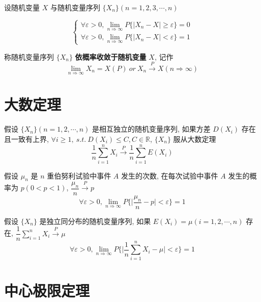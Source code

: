 \begin{definition}[依概率收敛]
	设随机变量 $X$ 与随机变量序列 $\{X_{n}\}(n = 1,2,3,\cdots,n)$
	
	$$\begin{cases}
		\forall \varepsilon > 0, \lim\limits_{n\Rightarrow \infty}P\{|X_{n}-X|\geq \varepsilon\} = 0\\
		\forall \varepsilon > 0, \lim\limits_{n\Rightarrow \infty}P\{|X_{n}-X|< \varepsilon\} = 1
	\end{cases}$$
	
	称随机变量序列 $\{X_{n}\}$ \textbf{依概率收敛于随机变量} $X$, 记作 
	$$\lim\limits_{n\Rightarrow \infty} X_{n} = X(P)\ or\ X_{n}\stackrel{P}{\longrightarrow}X(n\Rightarrow \infty)$$
\end{definition}

\section{大数定理}

\begin{theorem}[切比雪夫大数定理]
	假设 $\{X_{n}\}(n = 1,2,\cdots, n)$ 是相互独立的随机变量序列, 如果方差 $D(X_{i})$ 存在且一致有上界, $\forall i\geq 1,\ s.t.\ D(X_{i})\leq C, C\in \mathbb{R}$,
	$\{X_{n}\}$ 服从大数定理
	$$\dfrac{1}{n}\sum\limits_{i = 1}^{n}X_{i} \stackrel{P}{\longrightarrow} \dfrac{1}{n}\sum\limits_{i=1}^{n}E(X_{i})$$
\end{theorem}

\begin{theorem}[伯努利大数定理]
	假设 $\mu_{n}$ 是 $n$ 重伯努利试验中事件 $A$ 发生的次数, 在每次试验中事件 $A$ 发生的概率为 $p(0<p<1)$, $\dfrac{\mu_{n}}{n}\stackrel{P}{\longrightarrow}p$
	$$\forall \varepsilon > 0,\lim\limits_{n\Rightarrow \infty}P\{\big|\dfrac{\mu_{n}}{n} - p\big| < \varepsilon\} = 1$$
\end{theorem}

\begin{theorem}[辛钦大数定理]
	假设 $\{X_{n}\}$ 是独立同分布的随机变量序列, 如果 $E(X_{i}) = \mu(i = 1,2,\cdots,n)$ 存在, $\dfrac{1}{n}\sum\limits_{i=1}^{n}X_{i}\stackrel{P}{\longrightarrow}\mu$
	$$\forall \varepsilon > 0,\lim\limits_{n\Rightarrow \infty}P\{\big|\dfrac{1}{n}\sum\limits_{i=1}^{n}X_{i}-\mu\big| < \varepsilon\} = 1$$
\end{theorem}

\section{中心极限定理}

